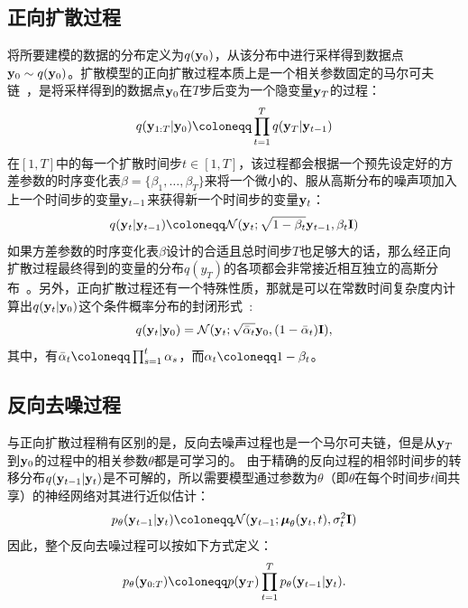 \subsection{正向扩散过程}
将所要建模的数据的分布定义为$q(\mathbf{y}_0)$，从该分布中进行采样得到数据点$\mathbf{y}_0\sim q(\mathbf{y}_0)$。扩散模型的正向扩散过程本质上是一个相关参数固定的马尔可夫链~\citep{Ho2020ddpm}，是将采样得到的数据点$\mathbf{y}_0$在$T$步后变为一个隐变量$\mathbf{y}_T$的过程：
\begin{equation}
  q(\by_{1:T} | \by_0) \defeq \prod_{t=1}^T q(\by_T | \by_{t-1} )
\end{equation}
在$[1, T]$中的每一个扩散时间步$t \in [1, T]$，该过程都会根据一个预先设定好的方差参数的时序变化表$\beta = \{\beta_1, \dotsc, \beta_T\}$来将一个微小的、服从高斯分布的噪声项加入上一个时间步的变量$\mathbf{y}_{t-1}$来获得新一个时间步的变量$\mathbf{y}_t$：
\begin{equation}
  q(\by_t|\by_{t-1}) \defeq \mathcal{N}(\by_t;\sqrt{1-\beta_t}\by_{t-1},\beta_t \bI)
\end{equation}
如果方差参数的时序变化表$\beta$设计的合适且总时间步$T$也足够大的话，那么经正向扩散过程最终得到的变量的分布$q(y_T)$的各项都会非常接近相互独立的高斯分布~\citep{Ho2020ddpm,nichol2021improved}。另外，正向扩散过程还有一个特殊性质，那就是可以在常数时间复杂度内计算出$q(\mathbf{y}_t|\mathbf{y}_0)$这个条件概率分布的封闭形式~\citep{Ho2020ddpm}:
\begin{align}
	q(\mathbf{y}_t|\mathbf{y}_0) = \mathcal{N}(\mathbf{y}_t; \sqrt{\bar\alpha_t}\mathbf{y}_0, (1-\bar\alpha_t)\mathbf{I}), \label{eq:one_step_noise}
\end{align}
其中，有$\bar\alpha_t \defeq \prod_{s=1}^t \alpha_s$，而$\alpha_t \defeq 1-\beta_t$。
\subsection{反向去噪过程}
与正向扩散过程稍有区别的是，反向去噪声过程也是一个马尔可夫链，但是从$\mathbf{y}_T$到$\mathbf{y}_0$的过程中的相关参数$\theta$都是可学习的。
由于精确的反向过程的相邻时间步的转移分布$q(\mathbf{y}_{t-1}|\mathbf{y}_t)$是不可解的，所以需要模型通过参数为$\theta$（即$\theta$在每个时间步$t$间共享）的神经网络对其进行近似估计：
\begin{equation}
  \label{eq:reverse_step}
  p_\theta(\by_{t-1}|\by_t) \defeq \mathcal{N}(\by_{t-1}; \bmu_\theta(\by_t, t), \sigma_t^2\bI)
\end{equation}
因此，整个反向去噪过程可以按如下方式定义：
\begin{equation}
p_\theta(\by_{0:T}) \defeq p(\by_T)\prod_{t=1}^T p_\theta(\by_{t-1}|\by_t).
\end{equation}

